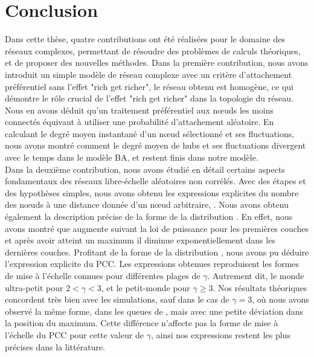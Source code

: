 %
\chapter*{Conclusion}
 


Dans cette thèse, quatre contributions ont été réalisées pour le domaine des réseaux complexes, permettant de résoudre des problèmes de calculs théoriques, et de proposer des nouvelles méthodes. Dans la première contribution, nous avons introduit un simple modèle de réseau complexe avec un critère d'attachement préférentiel sans l'effet "rich get richer", le réseau obtenu est homogène, ce qui démontre le rôle crucial de l'effet "rich get richer" dans la topologie du réseau. Nous en avons déduit qu'un traitement préférentiel aux nœuds les moins connectés équivaut à utiliser une probabilité d'attachement aléatoire. En calculant le degré moyen instantané d'un nœud sélectionné et ses fluctuations, nous avons montré comment le degré moyen de hubs et ses fluctuations divergent avec le temps dans le modèle BA, et restent finis dans notre modèle.\\

Dans la deuxième contribution, nous avons étudié en détail certains aspects fondamentaux des réseaux libre-échelle aléatoires non corrélés. Avec des étapes et des hypothèses simples, nous avons obtenu les expressions explicites du nombre des nœuds à une distance donnée d'un nœud arbitraire, \nl\nolinebreak. Nous avons obtenu également la description précise de la forme de la distribution \nolinebreak. En effet, nous avons montré que \nl augmente suivant la loi de puissance pour les premières couches et après avoir atteint un maximum il diminue exponentiellement dans les dernières couches. Profitant de la forme de la distribution \nl, nous avons pu déduire l'expression explicite du PCC. Les expressions obtenues reproduisent les formes de mise à l'échelle connues pour différentes plages de $\gamma$. Autrement dit, le monde ultra-petit pour $2<\gamma<3$, et le petit-monde pour $\gamma\ge 3$. Nos résultats théoriques concordent très bien avec les simulations, sauf dans le cas de $\gamma=3$, où nous avons observé la même forme, dans les queues de \nl, mais avec une petite déviation dans la position du maximum. Cette différence n'affecte pas la forme de mise à l'échelle du PCC pour cette valeur de $\gamma$, ainsi nos expressions restent les plus précises dans la littérature.\\

